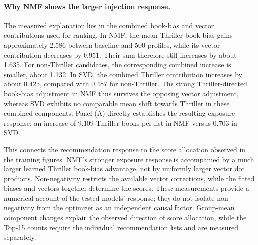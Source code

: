 \paragraph{Why NMF shows the larger injection response.}
The measured explanation lies in the combined book-bias and vector contributions used for ranking. In NMF, the mean Thriller book bias gains approximately 2.586 between baseline and 500 profiles, while its vector contribution decreases by 0.951. Their sum therefore still increases by about 1.635. For non-Thriller candidates, the corresponding combined increase is smaller, about 1.132. In SVD, the combined Thriller contribution increases by about 0.425, compared with 0.487 for non-Thriller. The strong Thriller-directed book-bias adjustment in NMF thus survives the opposing vector adjustment, whereas SVD exhibits no comparable mean shift towards Thriller in these combined components. Panel (A) directly establishes the resulting exposure response: an increase of 9.109 Thriller books per list in NMF versus 0.703 in SVD.

This connects the recommendation response to the score allocation observed in the training figures. NMF's stronger exposure response is accompanied by a much larger learned Thriller book-bias advantage, not by uniformly larger vector dot products. Non-negativity restricts the available vector corrections, while the fitted biases and vectors together determine the scores. These measurements provide a numerical account of the tested models' response; they do not isolate non-negativity from the optimizer as an independent causal factor. Group-mean component changes explain the observed direction of score allocation, while the Top-15 counts require the individual recommendation lists and are measured separately.


